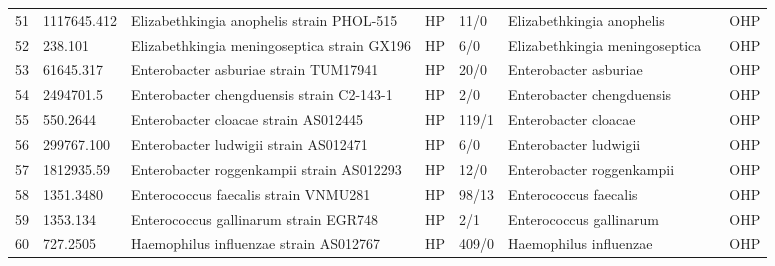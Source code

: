 \begin{longtable}{llllllll}
51  &   1117645.412 &                                Elizabethkingia anophelis strain PHOL-515 &    HP &      11/0 &                      Elizabethkingia anophelis &                               \cite{mctaggart2019application} &   OHP \\
52  &       238.101 &                              Elizabethkingia meningoseptica strain GX196 &    HP &       6/0 &                 Elizabethkingia meningoseptica &                               \cite{mctaggart2019application} &   OHP \\
53  &     61645.317 &                                    Enterobacter asburiae strain TUM17941 &    HP &      20/0 &                          Enterobacter asburiae &                               \cite{annavajhala2019multidrug} &   OHP \\
54  &     2494701.5 &                                Enterobacter chengduensis strain C2-143-1 &    HP &       2/0 &                      Enterobacter chengduensis &                                 \cite{wu2019characterization} &   OHP \\
55  &      550.2644 &                                     Enterobacter cloacae strain AS012445 &    HP &     119/1 &                           Enterobacter cloacae &                                 \cite{wu2019characterization} &   OHP \\
56  &    299767.100 &                                    Enterobacter ludwigii strain AS012471 &    HP &       6/0 &                          Enterobacter ludwigii &                               \cite{annavajhala2019multidrug} &   OHP \\
57  &    1812935.59 &                                Enterobacter roggenkampii strain AS012293 &    HP &      12/0 &                      Enterobacter roggenkampii &                                     \cite{uchida2020complete} &   OHP \\
58  &     1351.3480 &                                     Enterococcus faecalis strain VNMU281 &    HP &     98/13 &                          Enterococcus faecalis &                       \cite{fiore2019pathogenicity,1351.3480} &   OHP \\
59  &      1353.134 &                                    Enterococcus gallinarum strain EGR748 &    HP &       2/1 &                        Enterococcus gallinarum &                        \cite{monticelli2018clinical,1353.134} &   OHP \\
60  &      727.2505 &                                   Haemophilus influenzae strain AS012767 &    HP &     409/0 &                         Haemophilus influenzae &                                      \cite{shooraj2019clonal} &   OHP \\

\end{longtable}
